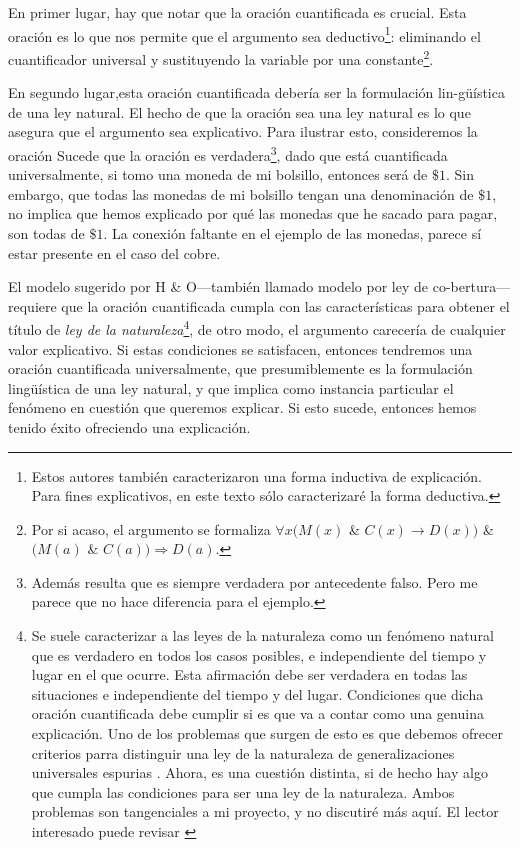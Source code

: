 En primer lugar, hay que notar que la oración cuantificada
es crucial. Esta oración es lo que nos permite que el 
argumento sea deductivo\footnote{
  Estos autores también caracterizaron una forma inductiva
  de explicación. Para fines explicativos, en este texto
  sólo caracterizaré la forma deductiva. 
}: 
eliminando el cuantificador universal y sustituyendo la 
variable por una constante\footnote{
	Por si acaso, el argumento se formaliza
  $\forall{x}(M(x)$ \& $C(x) \rightarrow
  D(x))$ \& $(M(a)$ \& $C(a))
  \Rightarrow	D(a)$. 
}. 

En segundo lugar,esta oración cuantificada debería ser la 
formulación lin-güística de una ley natural. El hecho de que
la oración sea una ley natural es lo que asegura que el
argumento sea explicativo. Para ilustrar esto, consideremos
la oración  Sucede que la oración es verdadera\footnote{
	Además resulta que es siempre verdadera por antecedente
	falso. Pero me parece que no hace diferencia para el
	ejemplo. 
},
dado que está cuantificada  universalmente, si tomo una
moneda de mi bolsillo, entonces será de $ \$1 $. Sin
embargo, que todas las monedas de mi bolsillo tengan una
denominación de $\$1$, no implica que hemos explicado por
qué las monedas que he sacado para pagar, son todas de
$ \$1 $. La conexión faltante en el ejemplo de las monedas,
parece sí estar presente en el caso del cobre.

El modelo sugerido por H \& O---también llamado modelo por
ley de co-bertura---requiere que la oración cuantificada
cumpla con las características para obtener el título de
\emph{ley de la naturaleza}\footnote{ 
  Se suele caracterizar a las leyes de la naturaleza como un
  fenómeno natural que es verdadero en todos los casos
  posibles, e	independiente del tiempo y lugar en el que
  ocurre. Esta afirmación debe ser verdadera en todas las
  situaciones e independiente del tiempo y del lugar.
  Condiciones que dicha oración cuantificada debe	cumplir si
  es que va a contar como una genuina explicación. Uno de
  los problemas que surgen de esto es que debemos ofrecer
  criterios parra distinguir una ley de la naturaleza de
  generalizaciones	universales espurias
  \parencite{Nagel1962}. Ahora, es una cuestión distinta, si
  de hecho hay algo que cumpla las condiciones para ser una
  ley de la naturaleza. Ambos problemas son tangenciales a
  mi	proyecto, y no discutiré más aquí. El lector
  interesado puede revisar	\parencite{sep-laws-of-nature}
}, 
de otro modo, el argumento carecería de cualquier valor
explicativo. Si estas condiciones se satisfacen, entonces
tendremos una oración cuantificada universalmente, que
presumiblemente es la formulación lingüística de una ley
natural, y que implica como instancia particular el fenómeno
en cuestión que queremos explicar. Si esto sucede, entonces
hemos tenido éxito ofreciendo una explicación.

